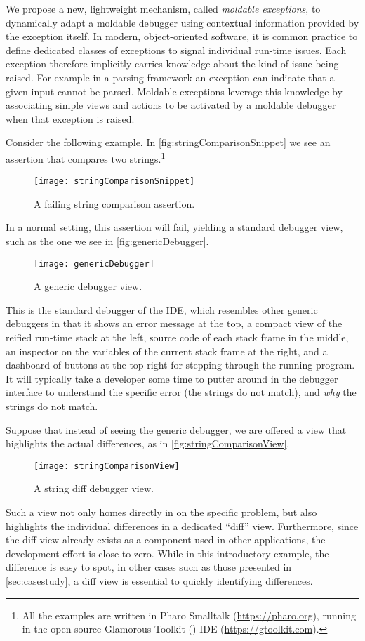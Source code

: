 \documentclass[sigplan,10pt]{acmart}
\newcommand{\GT}{\lst{GT}\xspace} %
\begin{document}
We propose a new, lightweight mechanism, called \emph{moldable exceptions}, to dynamically adapt a moldable debugger using contextual information provided by the exception itself.
In modern, object-oriented software, it is common practice to define dedicated classes of exceptions to signal individual run-time issues.
Each exception therefore implicitly carries knowledge about the kind of issue being raised.
For example in a parsing framework an exception can indicate that a given input cannot be parsed.
Moldable exceptions leverage this knowledge by associating simple views and actions to be activated by a moldable debugger when that exception is raised.

Consider the following example.
In \autoref{fig:stringComparisonSnippet} we see an assertion that compares two strings.\footnote{All the examples are written in Pharo Smalltalk (\url{https://pharo.org}), running in the open-source Glamorous Toolkit (\GT) IDE (\url{https://gtoolkit.com}).}
\begin{figure}[h]
  \texttt{[image: stringComparisonSnippet]}
  \caption{A failing string comparison assertion.}
  \label{fig:stringComparisonSnippet}
\end{figure}
In a normal setting, this assertion will fail, yielding a standard debugger view, such as the one we see in \autoref{fig:genericDebugger}.
\begin{figure}[h]
  \texttt{[image: genericDebugger]}
  \caption{A generic debugger view.}
  \label{fig:genericDebugger}
\end{figure}
This is the standard debugger of the \GT IDE, which resembles other generic debuggers in that it shows an error message at the top, a compact view of the reified run-time stack at the left, source code of each stack frame in the middle, an inspector on the variables of the current stack frame at the right, and a dashboard of buttons at the top right for stepping through the running program.
It will typically take a developer some time to putter around in the debugger interface to understand the specific error (the strings do not match), and \emph{why} the strings do not match.

Suppose that instead of seeing the generic debugger, we are offered a view that highlights the actual differences, as in \autoref{fig:stringComparisonView}.
\begin{figure}[h]
  \texttt{[image: stringComparisonView]}
  \caption{A string diff debugger view.}
  \label{fig:stringComparisonView}
\end{figure}
Such a view not only homes directly in on the specific problem, but also highlights the individual differences in a dedicated ``diff'' view.
Furthermore, since the diff view already exists as a component used in other applications, the development effort is close to zero.
While in this introductory example, the difference is easy to spot, in other cases such as those presented in \autoref{sec:casestudy}, a diff view is essential to quickly identifying differences.
\end{document}
